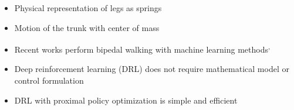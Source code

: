 \begin{frame}
\begin{columns}
\begin{column}{0.65\textwidth}
	\begin{itemize}
		\item Physical representation of legs as springs \footnotemark[1] \\[1em]
		\item Motion of the trunk with center of mass\footnotemark[1] \\[1em]
		\item Recent works perform bipedal walking with machine learning methods\footnotemark[2]\textsuperscript{,}\footnotemark[3] \\[1em]	
		\item Deep reinforcement learning (DRL) does not require mathematical model or control formulation\footnotemark[4]
		\item DRL with proximal policy optimization is simple and efficient\footnotemark[4]
	\end{itemize}
	\end{column}	
	\end{columns}
	
	
\end{frame}